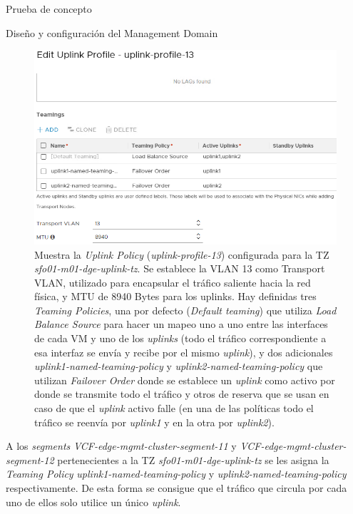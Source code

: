 \begin{section}{Prueba de concepto}
\begin{subsection}{Diseño y configuración del Management Domain}
\begin{figure}[h]
      \includegraphics[width=1\textwidth]{imaxes/pruebaconcepto/UplinkPolicy13.png}
      \caption{Muestra la \textit{Uplink Policy} (\textit{uplink-profile-13}) configurada para la TZ \textit{sfo01-m01-dge-uplink-tz}. Se establece la VLAN 13 como Transport VLAN, utilizado para encapsular el tráfico saliente hacia la red física, y MTU de 8940 Bytes para los uplinks. Hay definidas tres \textit{Teaming Policies}, una por defecto (\textit{Default teaming}) que utiliza \textit{Load Balance Source} para hacer un mapeo uno a uno entre las interfaces de cada VM y uno de los \textit{uplinks} (todo el tráfico correspondiente a esa interfaz se envía y recibe por el mismo \textit{uplink}), y dos adicionales \textit{uplink1-named-teaming-policy} y \textit{uplink2-named-teaming-policy} que utilizan \textit{Failover Order} donde se establece un \textit{uplink} como activo por donde se transmite todo el tráfico y otros de reserva que se usan en caso de que el \textit{uplink} activo falle (en una de las políticas todo el tráfico se reenvía por \textit{uplink1} y en la otra por \textit{uplink2}).}
      \label{fig:Uplink-Policy-13-NSXT} 
    \end{figure}
    \FloatBarrier
    A los \textit{segments} \textit{VCF-edge-mgmt-cluster-segment-11} y \textit{VCF-edge-mgmt-cluster-segment-12} pertenecientes a la TZ \textit{sfo01-m01-dge-uplink-tz} se les asigna la \textit{Teaming Policy} \textit{uplink1-named-teaming-policy} y \textit{uplink2-named-teaming-policy} respectivamente. De esta forma se consigue que el tráfico que circula por cada uno de ellos solo utilice un único \textit{uplink}. 
    \begin{figure}[h]
      \centering

\end{figure}
\end{subsection}
\end{section}
